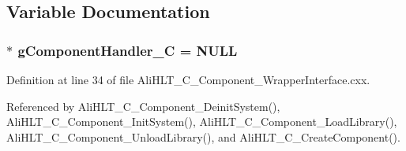 \subsection{Variable Documentation}
\subsubsection{$\ast$ {\bf g\-Component\-Handler\_\-C} = NULL\hspace{0.3cm}{\tt  [static]}}\label{AliHLT__C__Component__WrapperInterface_8cxx_a0}




Definition at line 34 of file Ali\-HLT\_\-C\_\-Component\_\-Wrapper\-Interface.cxx.

Referenced by Ali\-HLT\_\-C\_\-Component\_\-Deinit\-System(), Ali\-HLT\_\-C\_\-Component\_\-Init\-System(), Ali\-HLT\_\-C\_\-Component\_\-Load\-Library(), Ali\-HLT\_\-C\_\-Component\_\-Unload\-Library(), and Ali\-HLT\_\-C\_\-Create\-Component().